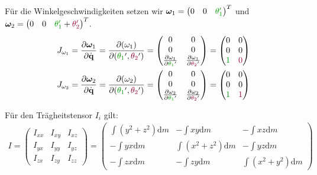 \documentclass[a4paper, 12pt]{scrartcl}
\newcommand{\gruen}[2][gruen]{\textcolor{#1}{#2}}
\newcommand{\dunkelrot}[2][dunkelrot]{\textcolor{#1}{#2}}
\begin{document}
Für die Winkelgeschwindigkeiten setzen wir   
$\bm{\omega}_1 = \begin{pmatrix}0 & 0 & \gruen{\theta_1'}\end{pmatrix}^T$ und 
$\bm{\omega}_2 = \begin{pmatrix} 0 & 0 &\gruen{\theta_1'} + \dunkelrot{\theta_2'}\end{pmatrix}^T$.
\begin{align*}
    J_{\omega_1} &=
    \frac{\partial \bm{\omega}_1}{\partial \dot{\textbf{q}}}
    =
    \frac{\partial (\omega_1)}{\partial (\gruen{\theta_1}', \dunkelrot{\theta_2}')}
    =
    \begin{pmatrix}
        0 & 0 \\
        0 & 0 \\
        \frac{\partial \omega_1}{\partial \gruen{\theta_1}'} 
        & \frac{\partial \omega_1}{\partial \dunkelrot{\theta_2}'} 
    \end{pmatrix}
    =
    \begin{pmatrix}
        0 & 0 \\
        0 & 0 \\
        \gruen{1} & \dunkelrot{0}
    \end{pmatrix}
    \\
    J_{\omega_2} &=
    \frac{\partial \bm{\omega}_2}{\partial \dot{\textbf{q}}}
    =
    \frac{\partial (\omega_2)}{\partial (\gruen{\theta_1}', \dunkelrot{\theta_2}')}
    =
    \begin{pmatrix}
        0 & 0 \\
        0 & 0 \\
        \frac{\partial \omega_2}{\partial \gruen{\theta_1}'} 
        & \frac{\partial \omega_2}{\partial \dunkelrot{\theta_2}'} 
    \end{pmatrix}
    =
    \begin{pmatrix}
        0 & 0 \\
        0 & 0 \\
        \gruen{1} & \dunkelrot{1}
    \end{pmatrix}
\end{align*}

Für den Trägheitstensor $I_i$ gilt:
\begin{align*}
    I = 
    \begin{pmatrix}
        I_{xx} & I_{xy} & I_{xz} \\
        I_{yx} & I_{yy} & I_{yz} \\
        I_{zx} & I_{zy} & I_{zz}
    \end{pmatrix}   
    =
    \begin{pmatrix}
        \int (y^2 + z^2) \mathrm{d}m & -\int xy \mathrm{d}m & -\int xz \mathrm{d}m \\
        -\int yx \mathrm{d}m & \int (x^2 + z^2) \mathrm{d}m & -\int yz \mathrm{d}m \\
        -\int zx \mathrm{d}m & -\int zy \mathrm{d}m & \int (x^2 + y^2) \mathrm{d}m
    \end{pmatrix}
\end{align*}
\end{document}
